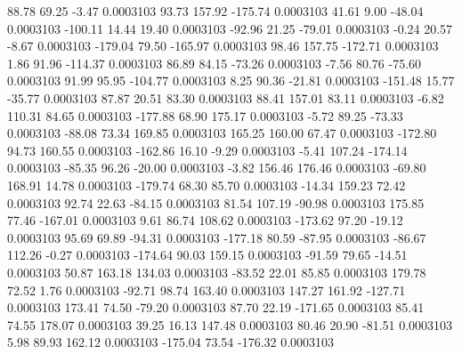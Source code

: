        88.78       69.25       -3.47     0.0003103
       93.73      157.92     -175.74     0.0003103
       41.61        9.00      -48.04     0.0003103
     -100.11       14.44       19.40     0.0003103
      -92.96       21.25      -79.01     0.0003103
       -0.24       20.57       -8.67     0.0003103
     -179.04       79.50     -165.97     0.0003103
       98.46      157.75     -172.71     0.0003103
        1.86       91.96     -114.37     0.0003103
       86.89       84.15      -73.26     0.0003103
       -7.56       80.76      -75.60     0.0003103
       91.99       95.95     -104.77     0.0003103
        8.25       90.36      -21.81     0.0003103
     -151.48       15.77      -35.77     0.0003103
       87.87       20.51       83.30     0.0003103
       88.41      157.01       83.11     0.0003103
       -6.82      110.31       84.65     0.0003103
     -177.88       68.90      175.17     0.0003103
       -5.72       89.25      -73.33     0.0003103
      -88.08       73.34      169.85     0.0003103
      165.25      160.00       67.47     0.0003103
     -172.80       94.73      160.55     0.0003103
     -162.86       16.10       -9.29     0.0003103
       -5.41      107.24     -174.14     0.0003103
      -85.35       96.26      -20.00     0.0003103
       -3.82      156.46      176.46     0.0003103
      -69.80      168.91       14.78     0.0003103
     -179.74       68.30       85.70     0.0003103
      -14.34      159.23       72.42     0.0003103
       92.74       22.63      -84.15     0.0003103
       81.54      107.19      -90.98     0.0003103
      175.85       77.46     -167.01     0.0003103
        9.61       86.74      108.62     0.0003103
     -173.62       97.20      -19.12     0.0003103
       95.69       69.89      -94.31     0.0003103
     -177.18       80.59      -87.95     0.0003103
      -86.67      112.26       -0.27     0.0003103
     -174.64       90.03      159.15     0.0003103
      -91.59       79.65      -14.51     0.0003103
       50.87      163.18      134.03     0.0003103
      -83.52       22.01       85.85     0.0003103
      179.78       72.52        1.76     0.0003103
      -92.71       98.74      163.40     0.0003103
      147.27      161.92     -127.71     0.0003103
      173.41       74.50      -79.20     0.0003103
       87.70       22.19     -171.65     0.0003103
       85.41       74.55      178.07     0.0003103
       39.25       16.13      147.48     0.0003103
       80.46       20.90      -81.51     0.0003103
        5.98       89.93      162.12     0.0003103
     -175.04       73.54     -176.32     0.0003103

